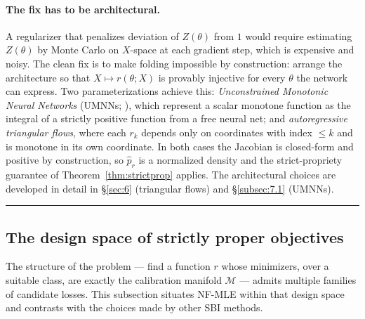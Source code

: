 \documentclass[11pt]{article}
\begin{document}
\paragraph{The fix has to be architectural.}
A regularizer that penalizes deviation of \(Z(\theta)\) from \(1\) would
require estimating \(Z(\theta)\) by Monte Carlo on \(X\)-space at each
gradient step, which is expensive and noisy. The clean fix is to make
folding impossible by construction: arrange the architecture so that
\(X \mapsto r(\theta; X)\) is provably injective for every \(\theta\)
the network can express. Two parameterizations achieve this:
\emph{Unconstrained Monotonic Neural Networks} (UMNNs;
\citealp{WehenkelLouppe2019}), which represent a scalar monotone
function as the integral of a strictly positive function from a free
neural net; and \emph{autoregressive triangular flows}, where each
\(r_k\) depends only on coordinates with index \(\le k\) and is monotone
in its own coordinate. In both cases the Jacobian is closed-form and
positive by construction, so \(\hat p_r\) is a normalized density and
the strict-propriety guarantee of Theorem~\ref{thm:strictprop} applies.
The architectural choices are developed in detail in \S\ref{sec:6}
(triangular flows) and \S\ref{subsec:7.1} (UMNNs).

\medskip\hrule\medskip

\setcounter{subsection}{6}
\subsection{The design space of strictly proper objectives}\label{subsec:3.7}

The structure of the problem --- find a function \(r\) whose minimizers,
over a suitable class, are exactly the calibration manifold
\(\mathcal{M}\) --- admits multiple families of candidate losses. This
subsection situates NF-MLE within that design space and contrasts with
the choices made by other SBI methods.
\end{document}
